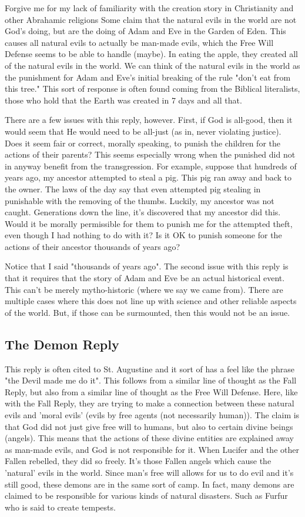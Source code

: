 Forgive me for my lack of familiarity with the creation story in Christianity and other Abrahamic religions Some claim that the natural evils in the world are not God’s doing, but are the doing of Adam and Eve in the Garden of Eden. This causes all natural evils to actually be man-made evils, which the Free Will Defense seems to be able to handle (maybe). In eating the apple, they created all of the natural evils in the world. We can think of the natural evils in the world as the punishment for Adam and Eve's initial breaking of the rule "don't eat from this tree." This sort of response is often found coming from the Biblical literalists, those who hold that the Earth was created in 7 days and all that. 

There are a few issues with this reply, however. First, if God is all-good, then it would seem that He would need to be all-just (as in, never violating justice). Does it seem fair or correct, morally speaking, to punish the children for the actions of their parents? This seems especially wrong when the punished did not in anyway benefit from the transgression. For example, suppose that hundreds of years ago, my ancestor attempted to steal a pig. This pig ran away and back to the owner. The laws of the day say that even attempted pig stealing in punishable with the removing of the thumbs. Luckily, my ancestor was not caught. Generations down the line, it's discovered that my ancestor did this. Would it be morally permissible for them to punish me for the attempted theft, even though I had nothing to do with it? Is it OK to punish someone for the actions of their ancestor thousands of years ago?

Notice that I said "thousands of years ago". The second issue with this reply is that it requires that the story of Adam and Eve be an actual historical event. This can't be merely mytho-historic (where we say we came from). There are multiple cases where this does not line up with science and other reliable aspects of the world. But, if those can be surmounted, then this would not be an issue.
\subsection{The Demon Reply}

This reply is often cited to St. Augustine and it sort of has a feel like the phrase "the Devil made me do it". This follows from a similar line of thought as the Fall Reply, but also from a similar line of thought as the Free Will Defense. Here, like with the Fall Reply, they are trying to make a connection between these natural evils and 'moral evils' (evils by free agents (not necessarily human)). The claim is that God did not just give free will to humans, but also to certain divine beings (angels). This means that the actions of these divine entities are explained away as man-made evils, and God is not responsible for it. When Lucifer and the other Fallen rebelled, they did so freely. It's those Fallen angels which cause the 'natural' evils in the world.  Since man's free will allows for us to do evil and it's still good, these demons are in the same sort of camp. In fact, many demons are claimed to be responsible for various kinds of natural disasters.  Such as Furfur who is said to create tempests.

